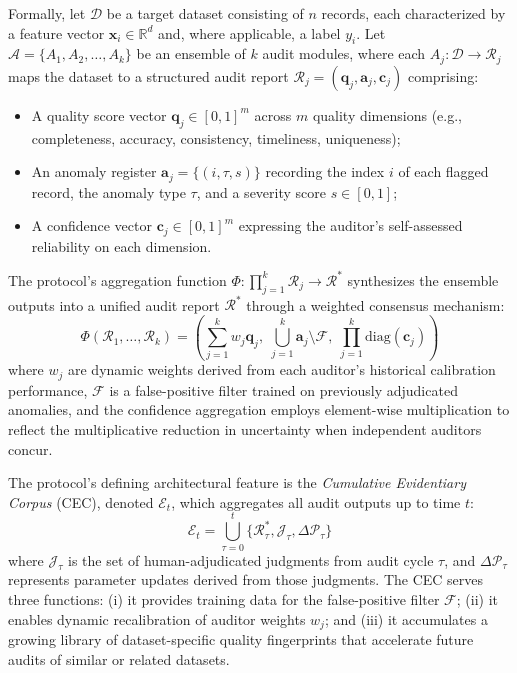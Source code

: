 \documentclass[12pt,a4paper]{article}
\theoremstyle{definition}
\theoremstyle{remark}
\begin{document}
Formally, let $\mathcal{D}$ be a target dataset consisting of $n$ records, each characterized by a feature vector $\mathbf{x}_i \in \mathbb{R}^d$ and, where applicable, a label $y_i$. Let $\mathcal{A} = \{A_1, A_2, \ldots, A_k\}$ be an ensemble of $k$ audit modules, where each $A_j: \mathcal{D} \rightarrow \mathcal{R}_j$ maps the dataset to a structured audit report $\mathcal{R}_j = (\mathbf{q}_j, \mathbf{a}_j, \mathbf{c}_j)$ comprising:
\begin{itemize}
\item A quality score vector $\mathbf{q}_j \in [0,1]^m$ across $m$ quality dimensions (e.g., completeness, accuracy, consistency, timeliness, uniqueness);
\item An anomaly register $\mathbf{a}_j = \{(i, \tau, s)\}$ recording the index $i$ of each flagged record, the anomaly type $\tau$, and a severity score $s \in [0,1]$;
\item A confidence vector $\mathbf{c}_j \in [0,1]^m$ expressing the auditor's self-assessed reliability on each dimension.
\end{itemize}

The protocol's aggregation function $\Phi: \prod_{j=1}^k \mathcal{R}_j \rightarrow \mathcal{R}^*$ synthesizes the ensemble outputs into a unified audit report $\mathcal{R}^*$ through a weighted consensus mechanism:
\begin{equation}
\Phi(\mathcal{R}_1, \ldots, \mathcal{R}_k) = \left( \sum_{j=1}^k w_j \mathbf{q}_j, \; \bigcup_{j=1}^k \mathbf{a}_j \setminus \mathcal{F}, \; \prod_{j=1}^k \text{diag}(\mathbf{c}_j) \right)
\end{equation}
where $w_j$ are dynamic weights derived from each auditor's historical calibration performance, $\mathcal{F}$ is a false-positive filter trained on previously adjudicated anomalies, and the confidence aggregation employs element-wise multiplication to reflect the multiplicative reduction in uncertainty when independent auditors concur.

The protocol's defining architectural feature is the \textit{Cumulative Evidentiary Corpus} (CEC), denoted $\mathcal{E}_t$, which aggregates all audit outputs up to time $t$:
\begin{equation}
\mathcal{E}_t = \bigcup_{\tau=0}^{t} \{\mathcal{R}^*_\tau, \mathcal{J}_\tau, \Delta\mathcal{P}_\tau\}
\end{equation}
where $\mathcal{J}_\tau$ is the set of human-adjudicated judgments from audit cycle $\tau$, and $\Delta\mathcal{P}_\tau$ represents parameter updates derived from those judgments. The CEC serves three functions: (i) it provides training data for the false-positive filter $\mathcal{F}$; (ii) it enables dynamic recalibration of auditor weights $w_j$; and (iii) it accumulates a growing library of dataset-specific quality fingerprints that accelerate future audits of similar or related datasets.
\end{document}
